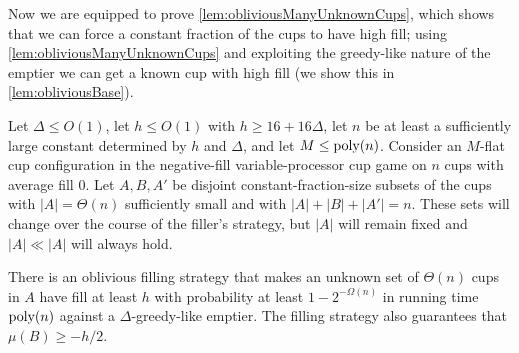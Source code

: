 Now we are equipped to prove \cref{lem:obliviousManyUnknownCups},
which shows that we can force a constant fraction of the cups to
have high fill; using \cref{lem:obliviousManyUnknownCups} and
exploiting the greedy-like nature of the emptier we can get a
known cup with high fill (we show this in
\cref{lem:obliviousBase}).
\begin{lemma}
  \label{lem:obliviousManyUnknownCups}
  Let $\Delta \le O(1)$, let $h \le O(1)$ with $h \ge
  16+16\Delta$, let $n$ be at least a sufficiently large constant
  determined by $h$ and $\Delta$, and let $M \le \operatorname{\text{poly}}(n)$.
  Consider an $M$-flat cup configuration in the negative-fill
  variable-processor cup game on $n$ cups with average fill $0$.
  Let $A, B, A'$ be disjoint constant-fraction-size subsets of
  the cups with $|A| = \Theta(n)$ sufficiently small and with
  $|A| + |B| + |A'| = n$. These sets will change over the course
  of the filler's strategy, but $|A|$ will remain fixed and $|A|
  \ll |A|$ will always hold.

  There is an oblivious filling strategy that makes an unknown
  set of $\Theta(n)$ cups in $A$ have fill at least $h$ with
  probability at least $1-2^{-\Omega(n)}$ in running time
  $\operatorname{\text{poly}}(n)$ against a $\Delta$-greedy-like emptier.
  The filling strategy also guarantees that $\mu(B) \ge -h/2$.
\end{lemma}
